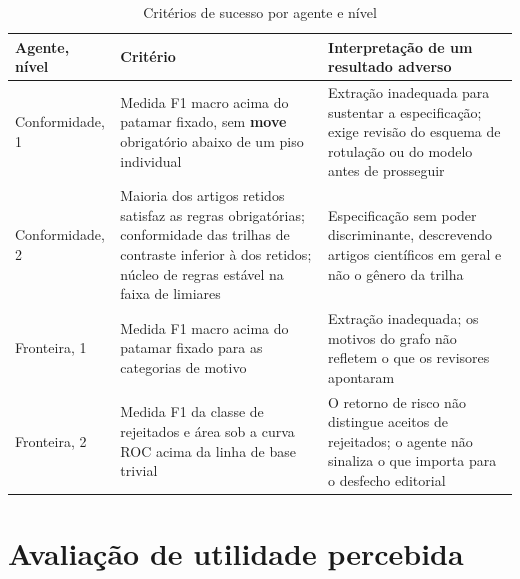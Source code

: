 \begin{table}[H]
\centering
\caption{Critérios de sucesso por agente e nível}
\label{tab:criterios}
\small
\begin{tabular}{|p{2.2cm}|p{5.0cm}|p{6.2cm}|}
\hline
\textbf{Agente, nível} & \textbf{Critério} & \textbf{Interpretação de um resultado adverso} \\
\hline
Conformidade, 1 & Medida F1 macro acima do patamar fixado, sem \textbf{move} obrigatório abaixo de um piso individual & Extração inadequada para sustentar a especificação; exige revisão do esquema de rotulação ou do modelo antes de prosseguir \\
\hline
Conformidade, 2 & Maioria dos artigos retidos satisfaz as regras obrigatórias; conformidade das trilhas de contraste inferior à dos retidos; núcleo de regras estável na faixa de limiares & Especificação sem poder discriminante, descrevendo artigos científicos em geral e não o gênero da trilha \\
\hline
Fronteira, 1 & Medida F1 macro acima do patamar fixado para as categorias de motivo & Extração inadequada; os motivos do grafo não refletem o que os revisores apontaram \\
\hline
Fronteira, 2 & Medida F1 da classe de rejeitados e área sob a curva ROC acima da linha de base trivial & O retorno de risco não distingue aceitos de rejeitados; o agente não sinaliza o que importa para o desfecho editorial \\
\hline
\end{tabular}
\end{table}



\section{Avaliação de utilidade percebida}
\label{sec:utilidade-futura}

